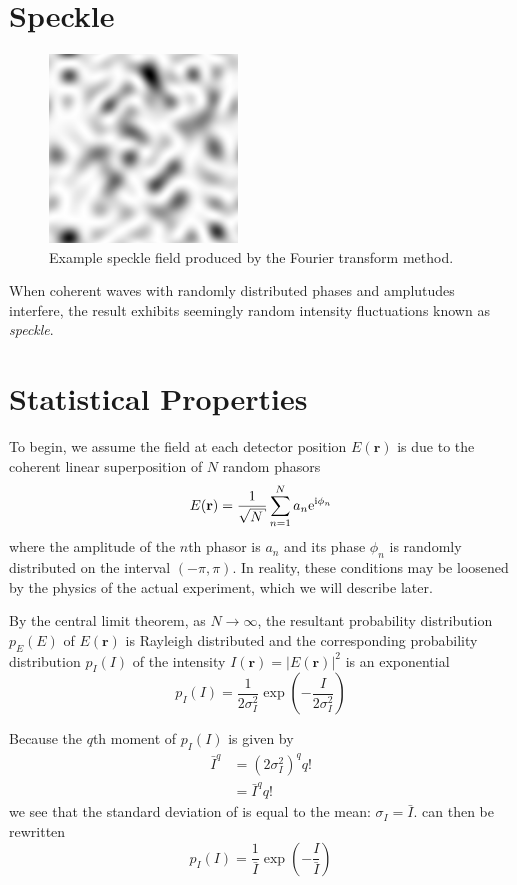 \section{Speckle}
\begin{figure}[ht]
\centering
\includegraphics[width=5cm,keepaspectratio]{figures/speckle.png}
\caption{Example speckle field produced by the Fourier transform method.}
\end{figure}
When coherent waves with randomly distributed phases and amplutudes
interfere, the result exhibits seemingly random intensity fluctuations
known as \textit{speckle}.  


\section{Statistical Properties}
To begin, we assume the field at each detector position $E(\mathbf{r})$ is
due to the coherent linear superposition of $N$ random phasors
\begin{equation}
E(\mathbf{r}) = \frac{1}{\sqrt{N}} \sum_{n=1}^{N} a_n \me^{\mi \phi_n}
\end{equation}
where the amplitude of the $n$th phasor is $a_n$ and its phase $\phi_n$ is
randomly distributed on the interval $(-\pi,\pi)$.  In reality, these
conditions may be loosened by the physics of the actual experiment, which
we will describe later.

By the central limit theorem, as $N\to\infty$, the resultant probability
distribution $p_E(E)$ of $E(\mathbf{r})$ is Rayleigh distributed and the
corresponding probability distribution $p_I(I)$ of the intensity
$I(\mathbf{r})=|E(\mathbf{r})|^2$ is an exponential
\begin{equation}
p_I(I) = \frac{1}{2\sigma_I^2}\exp\left(-\frac{I}{2\sigma_I^2}\right)
\label{eqn:propexp}
\end{equation}

Because the $q$th moment of $p_I(I)$ is given by 
\begin{align}
\bar{I}^q&=(2\sigma_I^2)^q q!\\
         &=\bar{I}^q q!
\end{align}
we see that the standard deviation of is equal to the mean: 
$\sigma_I=\bar{I}$.   can then be rewritten
\begin{equation}
p_I(I) = \frac{1}{\bar{I}}\exp\left(-\frac{I}{\bar{I}}\right)
\end{equation}


